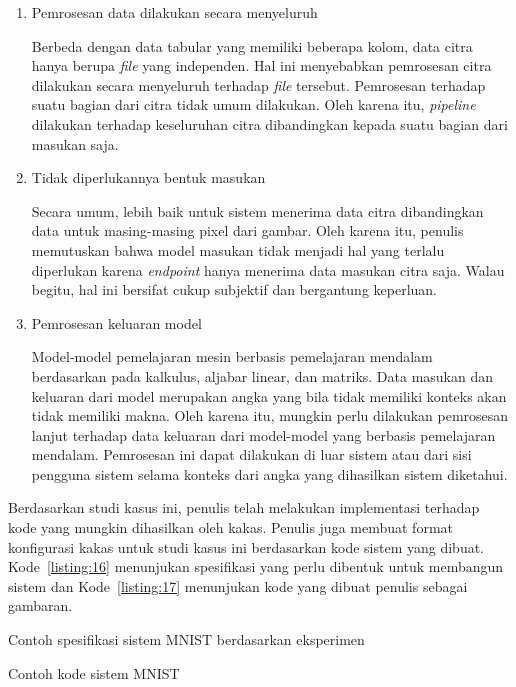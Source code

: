 \begin{enumerate}
	\item Pemrosesan data dilakukan secara menyeluruh
	
	Berbeda dengan data tabular yang memiliki beberapa kolom, data citra hanya berupa \textit{file} yang independen.
	Hal ini menyebabkan pemrosesan citra dilakukan secara menyeluruh terhadap \textit{file} tersebut.
	Pemrosesan terhadap suatu bagian dari citra tidak umum dilakukan.
	Oleh karena itu, \textit{pipeline} dilakukan terhadap keseluruhan citra dibandingkan kepada suatu bagian dari masukan saja. 

	\item Tidak diperlukannya bentuk masukan
	
	Secara umum, lebih baik untuk sistem menerima data citra dibandingkan data untuk masing-masing pixel dari gambar.
	Oleh karena itu, penulis memutuskan bahwa model masukan tidak menjadi hal yang terlalu diperlukan karena \textit{endpoint} hanya menerima data masukan citra saja.
	Walau begitu, hal ini bersifat cukup subjektif dan bergantung keperluan.
	
	\item Pemrosesan keluaran model
	
	Model-model pemelajaran mesin berbasis pemelajaran mendalam berdasarkan pada kalkulus, aljabar linear, dan matriks.
	Data masukan dan keluaran dari model merupakan angka yang bila tidak memiliki konteks akan tidak memiliki makna.
	Oleh karena itu, mungkin perlu dilakukan pemrosesan lanjut terhadap data keluaran dari model-model yang berbasis pemelajaran mendalam.
	Pemrosesan ini dapat dilakukan di luar sistem atau dari sisi pengguna sistem selama konteks dari angka yang dihasilkan sistem diketahui.

\end{enumerate}

Berdasarkan studi kasus ini, penulis telah melakukan implementasi terhadap kode yang mungkin dihasilkan oleh kakas.
Penulis juga membuat format konfigurasi kakas untuk studi kasus ini berdasarkan kode sistem yang dibuat.
Kode~\ref{listing:16} menunjukan spesifikasi yang perlu dibentuk untuk membangun sistem dan Kode~\ref{listing:17} menunjukan kode yang dibuat penulis sebagai gambaran.

\begin{code}
	\caption{Contoh spesifikasi sistem MNIST berdasarkan eksperimen}\label{listing:16}
\end{code}

\begin{code}
	\caption{Contoh kode sistem MNIST}\label{listing:17}
\end{code}

